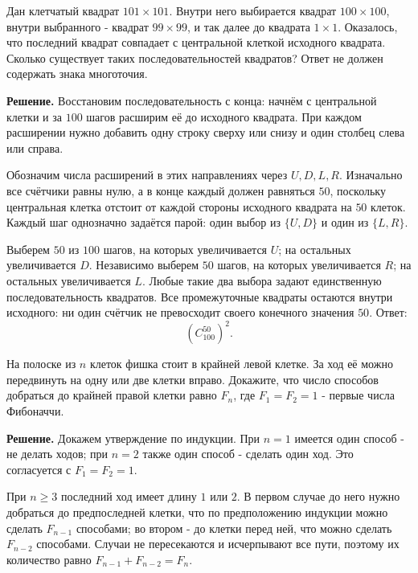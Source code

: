 \begin{problems}
\item Дан клетчатый квадрат $101\times101$. Внутри него выбирается квадрат $100\times100$, внутри выбранного - квадрат $99\times99$, и так далее до квадрата $1\times1$. Оказалось, что последний квадрат совпадает с центральной клеткой исходного квадрата. Сколько существует таких последовательностей квадратов? Ответ не должен содержать знака многоточия.
\par\smallskip\noindent\textbf{Решение.} Восстановим последовательность с конца: начнём с центральной клетки и за $100$ шагов расширим её до исходного квадрата. При каждом расширении нужно добавить одну строку сверху или снизу и один столбец слева или справа.
\par Обозначим числа расширений в этих направлениях через $U,D,L,R$. Изначально все счётчики равны нулю, а в конце каждый должен равняться $50$, поскольку центральная клетка отстоит от каждой стороны исходного квадрата на $50$ клеток. Каждый шаг однозначно задаётся парой: один выбор из $\{U,D\}$ и один из $\{L,R\}$.
\par Выберем $50$ из $100$ шагов, на которых увеличивается $U$; на остальных увеличивается $D$. Независимо выберем $50$ шагов, на которых увеличивается $R$; на остальных увеличивается $L$. Любые такие два выбора задают единственную последовательность квадратов. Все промежуточные квадраты остаются внутри исходного: ни один счётчик не превосходит своего конечного значения $50$. Ответ:
\[
\boxed{\left(C_{100}^{50}\right)^2}.
\]\par

\item На полоске из $n$ клеток фишка стоит в крайней левой клетке. За ход её можно передвинуть на одну или две клетки вправо. Докажите, что число способов добраться до крайней правой клетки равно $F_n$, где $F_1=F_2=1$ - первые числа Фибоначчи.
\par\smallskip\noindent\textbf{Решение.} Докажем утверждение по индукции. При $n=1$ имеется один способ - не делать ходов; при $n=2$ также один способ - сделать один ход. Это согласуется с $F_1=F_2=1$.
\par При $n\ge3$ последний ход имеет длину $1$ или $2$. В первом случае до него нужно добраться до предпоследней клетки, что по предположению индукции можно сделать $F_{n-1}$ способами; во втором - до клетки перед ней, что можно сделать $F_{n-2}$ способами. Случаи не пересекаются и исчерпывают все пути, поэтому их количество равно $F_{n-1}+F_{n-2}=F_n$.\par


\end{problems}
